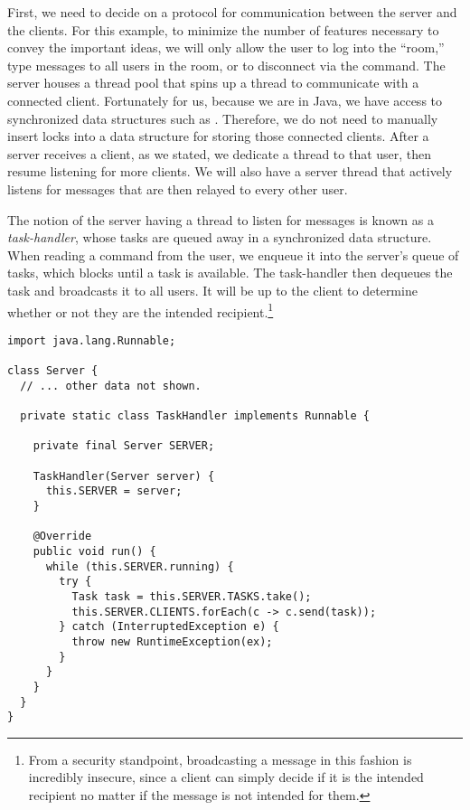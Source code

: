 First, we need to decide on a protocol for communication between the server and the clients. 
For this example, to minimize the number of features necessary to convey the important ideas, we will only allow the user to log into the ``room,'' type messages to all users in the room, or to disconnect via the  command. 
The server houses a thread pool that spins up a thread to communicate with a connected client. 
Fortunately for us, because we are in Java, we have access to synchronized data structures such as . 
Therefore, we do not need to manually insert locks into a data structure for storing those connected clients. 
After a server receives a client, as we stated, we dedicate a thread to that user, then resume listening for more clients.
We will also have a server thread that actively listens for messages that are then relayed to every other user. 

The notion of the server having a thread to listen for messages is known as a \emph{task-handler}, whose tasks are queued away in a synchronized  data structure. 
When reading a command from the user, we enqueue it into the server's queue of tasks, which blocks until a task is available. 
The task-handler then dequeues the task and broadcasts it to all users. 
It will be up to the client to determine whether or not they are the intended recipient.\footnote{From a security standpoint, broadcasting a message in this fashion is incredibly insecure, since a client can simply decide if it is the intended recipient no matter if the message is not intended for them.}

\begin{lstlisting}[language=MyJava]
import java.lang.Runnable;

class Server {
  // ... other data not shown.

  private static class TaskHandler implements Runnable {

    private final Server SERVER;

    TaskHandler(Server server) { 
      this.SERVER = server; 
    }

    @Override
    public void run() {
      while (this.SERVER.running) {
        try {
          Task task = this.SERVER.TASKS.take();
          this.SERVER.CLIENTS.forEach(c -> c.send(task));
        } catch (InterruptedException e) { 
          throw new RuntimeException(ex);
        }
      }
    }
  }
}
\end{lstlisting}

